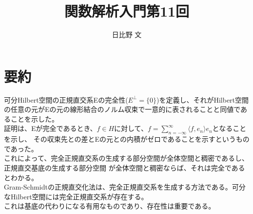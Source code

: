 \documentclass[12pt,a4paper]{ltjsarticle}
\begin{document}
\title{関数解析入門第11回}
\author{日比野 文}
\maketitle

\section{要約}
可分Hilbert空間の正規直交系Eの完全性($E^\perp=\{0\}$)を定義し、それがHilbert空間の任意の元がEの元の線形結合のノルム収束で一意的に表されることと同値であることを示した。\\
証明は、Eが完全であるとき、$f\in H$に対して、$f=\sum_{n=-\infty}^\infty \langle f,e_n\rangle e_n$となることを示し、
その収束先との差とEの元との内積がゼロであることを示すというものであった。\\
これによって、完全正規直交系の生成する部分空間が全体空間と稠密であるし、正規直交基底の生成する部分空間
が全体空間と稠密ならば、それは完全であるとわかる。\\
Gram-Schmidtの正規直交化法は、完全正規直交系を生成する方法である。可分なHilbert空間には完全正規直交系が存在する。\\
これは基底の代わりになる有用なものであり、存在性は重要である。\\
\end{document}
